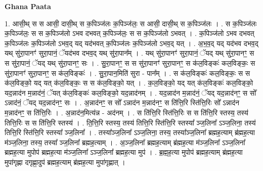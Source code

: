 \documentclass[17pt]{extarticle}
\begin{document}
\textbf{Ghana Paata } \newline

1. आसी॒थ् स स आसी॒ दासी॒थ् स क॒पिञ्ज॑लः क॒पिञ्ज॑लः॒ स आसी॒ दासी॒थ् स क॒पिञ्ज॑लः । . स क॒पिञ्ज॑लः क॒पिञ्ज॑लः॒ स स क॒पिञ्ज॑लो ऽभव दभवत् क॒पिञ्ज॑लः॒ स स क॒पिञ्ज॑लो ऽभवत् । . क॒पिञ्ज॑लो ऽभव दभवत् क॒पिञ्ज॑लः क॒पिञ्ज॑लो ऽभव॒द् यद् यद॑भवत् क॒पिञ्ज॑लः क॒पिञ्ज॑लो ऽभव॒द् यत् । . अ॒भ॒व॒द् यद् यद॑भव दभव॒द् यथ् सु॑रा॒पानꣳ॑ सुरा॒पानं॒ ॅयद॑भव दभव॒द् यथ् सु॑रा॒पान᳚म् । . यथ् सु॑रा॒पानꣳ॑ सुरा॒पानं॒ ॅयद् यथ् सु॑रा॒पानꣳ॒॒ स स सु॑रा॒पानं॒ ॅयद् यथ् सु॑रा॒पानꣳ॒॒ सः । . सु॒रा॒पानꣳ॒॒ स स सु॑रा॒पानꣳ॑ सुरा॒पानꣳ॒॒ स क॑ल॒विङ्कः॑ कल॒विङ्कः॒ स सु॑रा॒पानꣳ॑ सुरा॒पानꣳ॒॒ स क॑ल॒विङ्कः॑ । . सु॒रा॒पान॒मिति॑ सुरा - पान᳚म् । . स क॑ल॒विङ्कः॑ कल॒विङ्कः॒ स स क॑ल॒विङ्को॒ यद् यत् क॑ल॒विङ्कः॒ स स क॑ल॒विङ्को॒ यत् । . क॒ल॒विङ्को॒ यद् यत् क॑ल॒विङ्कः॑ कल॒विङ्को॒ यद॒न्नाद॑न म॒न्नाद॑नं॒ ॅयत् क॑ल॒विङ्कः॑ कल॒विङ्को॒ यद॒न्नाद॑नम् । . यद॒न्नाद॑न म॒न्नाद॑नं॒ ॅयद् यद॒न्नाद॑नꣳ॒॒ स सो᳚ ऽन्नाद॑नं॒ ॅयद् यद॒न्नाद॑नꣳ॒॒ सः । . अ॒न्नाद॑नꣳ॒॒ स सो᳚ ऽन्नाद॑न म॒न्नाद॑नꣳ॒॒ स ति॑त्ति॒रि स्ति॑त्ति॒रिः सो᳚ ऽन्नाद॑न म॒न्नाद॑नꣳ॒॒ स ति॑त्ति॒रिः । . अ॒न्नाद॑न॒मित्य॑न्न - अद॑नम् । . स ति॑त्ति॒रि स्ति॑त्ति॒रिः स स ति॑त्ति॒रि स्तस्य॒ तस्य॑ तित्ति॒रिः स स ति॑त्ति॒रि स्तस्य॑ । . ति॒त्ति॒रि स्तस्य॒ तस्य॑ तित्ति॒रि स्ति॑त्ति॒रि स्तस्या᳚ ञ्ज॒लिना᳚ ऽञ्ज॒लिना॒ तस्य॑ तित्ति॒रि स्ति॑त्ति॒रि स्तस्या᳚ ञ्ज॒लिना᳚ । . तस्या᳚ञ्ज॒लिना᳚ ऽञ्ज॒लिना॒ तस्य॒ तस्या᳚ञ्ज॒लिना᳚ ब्रह्मह॒त्याम् ब्र॑ह्मह॒त्या म॑ञ्ज॒लिना॒ तस्य॒ तस्या᳚ ञ्ज॒लिना᳚ ब्रह्मह॒त्याम् । . अ॒ञ्ज॒लिना᳚ ब्रह्मह॒त्याम् ब्र॑ह्मह॒त्या म॑ञ्ज॒लिना᳚ ऽञ्ज॒लिना᳚ ब्रह्मह॒त्या मुपोप॑ ब्रह्मह॒त्या म॑ञ्ज॒लिना᳚ ऽञ्ज॒लिना᳚ ब्रह्मह॒त्या मुप॑ । . ब्र॒ह्म॒ह॒त्या मुपोप॑ ब्रह्मह॒त्याम् ब्र॑ह्मह॒त्या मुपा॑गृह्णा दगृह्णा॒दुप॑ ब्रह्मह॒त्याम् ब्र॑ह्मह॒त्या मुपा॑गृह्णात् । \newline
\end{document}
